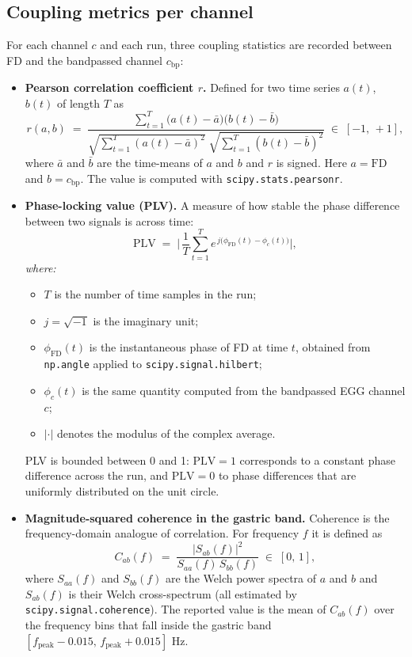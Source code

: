 \documentclass[11pt]{article}
\begin{document}
\subsection{Coupling metrics per channel}

For each channel $c$ and each run, three coupling statistics are
recorded between FD and the bandpassed channel $c_{\text{bp}}$:

\begin{itemize}
\item \textbf{Pearson correlation coefficient $r$.} Defined for two
time series $a(t)$, $b(t)$ of length $T$ as
\begin{equation}
r(a,b) \;=\;
\dfrac{\sum_{t=1}^{T}\bigl(a(t)-\bar a\bigr)\bigl(b(t)-\bar b\bigr)}
      {\sqrt{\sum_{t=1}^{T}(a(t)-\bar a)^{2}}\;
       \sqrt{\sum_{t=1}^{T}(b(t)-\bar b)^{2}}}
\;\in\;[-1,\,+1],
\end{equation}
where $\bar a$ and $\bar b$ are the time-means of $a$ and $b$ and $r$
is signed. Here $a = \mathrm{FD}$ and $b = c_{\text{bp}}$. The value
is computed with \texttt{scipy.stats.pearsonr}.

\item \textbf{Phase-locking value (PLV).} A measure of how stable the
phase difference between two signals is across time:
\begin{equation}
\mathrm{PLV} \;=\; \biggl|\,\frac{1}{T}\sum_{t=1}^{T} e^{\,j\bigl(\phi_{\text{FD}}(t) - \phi_{c}(t)\bigr)}\biggr|,
\end{equation}
\textit{where:}
\begin{itemize}\setlength{\itemsep}{1pt}
\item $T$ is the number of time samples in the run;
\item $j = \sqrt{-1}$ is the imaginary unit;
\item $\phi_{\text{FD}}(t)$ is the instantaneous phase of FD at time
$t$, obtained from \texttt{np.angle} applied to
\texttt{scipy.signal.hilbert};
\item $\phi_{c}(t)$ is the same quantity computed from the bandpassed
EGG channel $c$;
\item $|\cdot|$ denotes the modulus of the complex average.
\end{itemize}
PLV is bounded between 0 and 1: $\mathrm{PLV}=1$ corresponds to a
constant phase difference across the run, and $\mathrm{PLV}=0$ to
phase differences that are uniformly distributed on the unit circle.

\item \textbf{Magnitude-squared coherence in the gastric band.}
Coherence is the frequency-domain analogue of correlation. For
frequency $f$ it is defined as
\begin{equation}
C_{ab}(f) \;=\; \dfrac{|S_{ab}(f)|^{2}}{S_{aa}(f)\,S_{bb}(f)}
\;\in\;[0,\,1],
\end{equation}
where $S_{aa}(f)$ and $S_{bb}(f)$ are the Welch power spectra of $a$
and $b$ and $S_{ab}(f)$ is their Welch cross-spectrum (all estimated
by \texttt{scipy.signal.coherence}). The reported value is the mean
of $C_{ab}(f)$ over the frequency bins that fall inside the gastric
band $[f_{\text{peak}}-0.015,\,f_{\text{peak}}+0.015]$ Hz.
\end{itemize}
\end{document}
